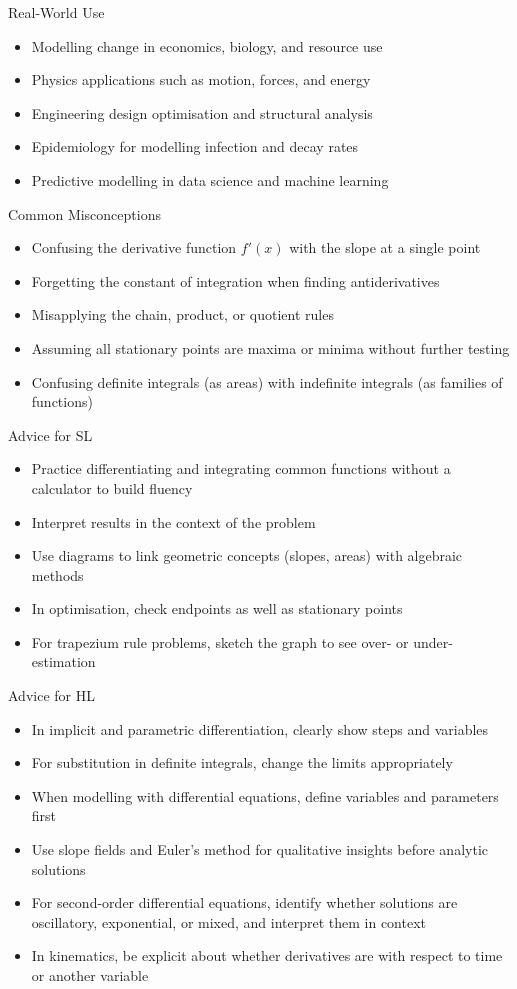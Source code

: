 \documentclass[11pt]{article}
\def\textbf#1{#1}%
\begin{document}
\textbf{Real-World Use}  
\begin{itemize}
  \item Modelling change in economics, biology, and resource use
  \item Physics applications such as motion, forces, and energy
  \item Engineering design optimisation and structural analysis
  \item Epidemiology for modelling infection and decay rates
  \item Predictive modelling in data science and machine learning
\end{itemize}

\textbf{Common Misconceptions}  
\begin{itemize}
  \item Confusing the derivative function $f'(x)$ with the slope at a single point
  \item Forgetting the constant of integration when finding antiderivatives
  \item Misapplying the chain, product, or quotient rules
  \item Assuming all stationary points are maxima or minima without further testing
  \item Confusing definite integrals (as areas) with indefinite integrals (as families of functions)
\end{itemize}

\textbf{Advice for SL}  
\begin{itemize}
  \item Practice differentiating and integrating common functions without a calculator to build fluency
  \item Interpret results in the context of the problem
  \item Use diagrams to link geometric concepts (slopes, areas) with algebraic methods
  \item In optimisation, check endpoints as well as stationary points
  \item For trapezium rule problems, sketch the graph to see over- or under-estimation
\end{itemize}

\textbf{Advice for HL}  
\begin{itemize}
  \item In implicit and parametric differentiation, clearly show steps and variables
  \item For substitution in definite integrals, change the limits appropriately
  \item When modelling with differential equations, define variables and parameters first
  \item Use slope fields and Euler’s method for qualitative insights before analytic solutions
  \item For second-order differential equations, identify whether solutions are oscillatory, exponential, or mixed, and interpret them in context
  \item In kinematics, be explicit about whether derivatives are with respect to time or another variable
\end{itemize}
\end{document}
